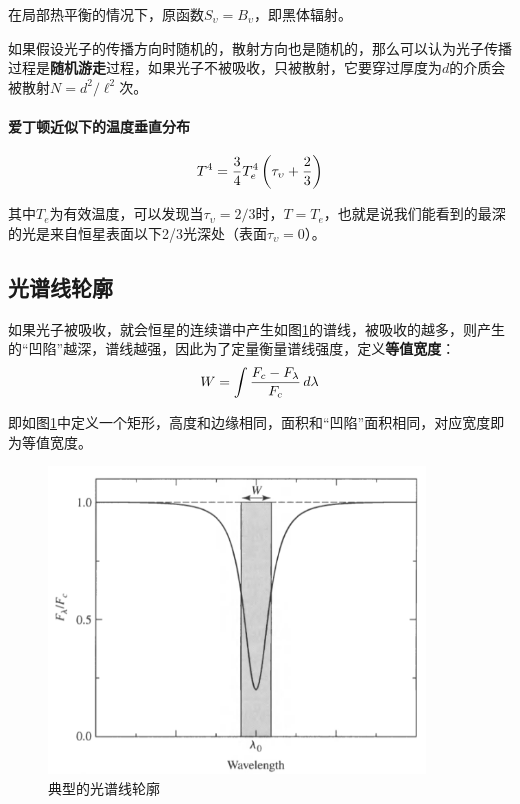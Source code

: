在局部热平衡的情况下，原函数$S_\upsilon=B_\upsilon$，即黑体辐射。

如果假设光子的传播方向时随机的，散射方向也是随机的，那么可以认为光子传播过程是\textbf{随机游走}过程，如果光子不被吸收，只被散射，它要穿过厚度为$d$的介质会被散射$N=d^2/\ell^2$次。

\paragraph{爱丁顿近似下的温度垂直分布}
\begin{equation}
  T^4={3\over 4}T_e^4\left(\tau_\upsilon+{2\over3}\right)
\end{equation}

其中$T_e$为有效温度，可以发现当$\tau_\upsilon=2/3$时，$T=T_e$，也就是说我们能看到的最深的光是来自恒星表面以下2/3光深处（表面$\tau_\upsilon=0$）。

\subsection{光谱线轮廓}
如果光子被吸收，就会恒星的连续谱中产生如图\ref{fig:spectrum}的谱线，被吸收的越多，则产生的``凹陷''越深，谱线越强，因此为了定量衡量谱线强度，定义\textbf{等值宽度}：
\begin{equation}
  W=\int{\displaystyle F_c-F_\lambda \over \displaystyle F_c}\,d\lambda
\end{equation}

即如图\ref{fig:spectrum}中定义一个矩形，高度和边缘相同，面积和``凹陷''面积相同，对应宽度即为等值宽度。

\begin{figure}[hbt]
  \centering
  \includegraphics[width=10cm]{chapters/09/spectrum}
  \caption{典型的光谱线轮廓}
  \label{fig:spectrum}
\end{figure}

